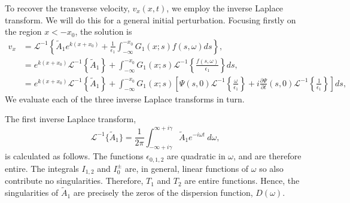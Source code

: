 \documentclass[12pt, draft]{../style-files/ociamthesis}
\begin{document}
To recover the transverse velocity, $v_x(x, t)$, we employ the inverse Laplace transform. We will do this for a general initial perturbation. Focusing firstly on the region $x < -x_0$, the solution is
\newcommand{\e}{\epsilon}
\begin{align}
v_x &= \mathcal{L}^{-1} \left\{ \tilde{A}_1 e^{k(x+x_0)} + \frac{1}{\e_1} \int_{-\infty}^{-x_0} G_1(x;s)f(s, \omega)ds \right\}, \\
&= e^{k(x+x_0)} \mathcal{L}^{-1}\left\{ \tilde{A}_1 \right\} + \int_{-\infty}^{-x_0} G_1(x;s) \mathcal{L}^{-1}\left\{ \frac{f(s, \omega)}{\e_1} \right\} ds, \\
&= e^{k(x+x_0)} \mathcal{L}^{-1}\left\{ \tilde{A}_1 \right\} + \int_{-\infty}^{-x_0} G_1(x;s) \left[ \Psi (s, 0) \mathcal{L}^{-1}\left\{ \frac{\omega}{\e_1} \right\} + i \frac{\partial \Psi}{\partial t}(s, 0) \mathcal{L}^{-1}\left\{ \frac{1}{\e_1} \right\}\right] ds,
\label{sol incomp}
\end{align}
We evaluate each of the three inverse Laplace transforms in turn.

The first inverse Laplace transform,
\begin{equation}
\mathcal{L}^{-1} \{\tilde{A}_1\} = \frac{1}{2\pi} \int_{-\infty + i\gamma}^{\infty + i\gamma} \tilde{A}_1 e^{-i\omega t} ~d\omega,
\end{equation}
is calculated as follows. The functions $\epsilon_{0,1,2}$ are quadratic in $\omega$, and are therefore entire. The integrals $I_{1,2}$ and $I_0^\pm$ are, in general, linear functions of $\omega$ so also contribute no singularities. Therefore, $T_1$ and $T_2$ are entire functions. Hence, the singularities of $\tilde{A}_1$ are precisely the zeros of the dispersion function, $D(\omega)$.
\end{document}
